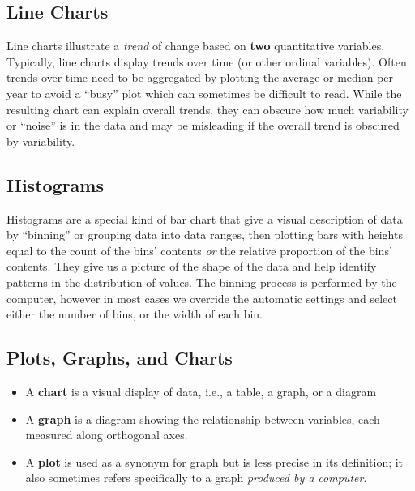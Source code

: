 \documentclass{article}
\begin{document}
\subsection{Line Charts}
Line charts illustrate a \textit{trend} of change based on \textbf{two}
quantitative variables. Typically, line charts display trends over time
(or other ordinal variables). Often trends over time need to be
aggregated by plotting the average or median per year to avoid a
``busy'' plot which can sometimes be difficult to read. While the
resulting chart can explain overall trends, they can obscure how much
variability or ``noise'' is in the data and may be misleading if the
overall trend is obscured by variability.
\subsection{Histograms}
Histograms are a special kind of bar chart that give a visual
description of data by ``binning'' or grouping data into data ranges,
then plotting bars with heights equal to the count of the bins'
contents \textit{or} the relative proportion of the bins' contents.
They give us a picture of the shape of the data and help identify
patterns in the distribution of values. The binning process is
performed by the computer, however in most cases we override the
automatic settings and select either the number of bins, or the width
of each bin.
\subsection{Plots, Graphs, and Charts}
\begin{itemize}
    \item A \textbf{chart} is a visual display of data, i.e., a table,
          a graph, or a diagram
    \item A \textbf{graph} is a diagram showing the relationship
          between variables, each measured along orthogonal axes.
    \item A \textbf{plot} is used as a synonym for graph but is less
          precise in its definition; it also sometimes refers
          specifically to a graph \textit{produced by a computer}.
\end{itemize}
\end{document}
